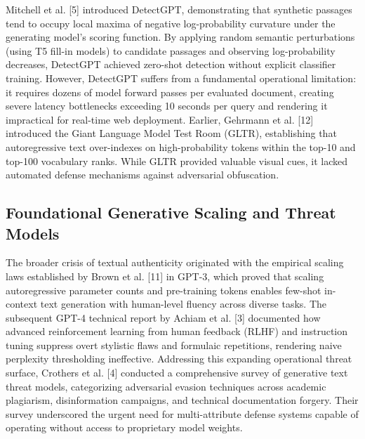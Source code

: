 \documentclass[conference]{IEEEtran}
\begin{document}
Mitchell et al. [5] introduced DetectGPT, demonstrating that synthetic passages tend to occupy local maxima of negative log-probability curvature under the generating model's scoring function. By applying random semantic perturbations (using T5 fill-in models) to candidate passages and observing log-probability decreases, DetectGPT achieved zero-shot detection without explicit classifier training. However, DetectGPT suffers from a fundamental operational limitation: it requires dozens of model forward passes per evaluated document, creating severe latency bottlenecks exceeding 10 seconds per query and rendering it impractical for real-time web deployment. Earlier, Gehrmann et al. [12] introduced the Giant Language Model Test Room (GLTR), establishing that autoregressive text over-indexes on high-probability tokens within the top-10 and top-100 vocabulary ranks. While GLTR provided valuable visual cues, it lacked automated defense mechanisms against adversarial obfuscation.

\subsection{Foundational Generative Scaling and Threat Models}
The broader crisis of textual authenticity originated with the empirical scaling laws established by Brown et al. [11] in GPT-3, which proved that scaling autoregressive parameter counts and pre-training tokens enables few-shot in-context text generation with human-level fluency across diverse tasks. The subsequent GPT-4 technical report by Achiam et al. [3] documented how advanced reinforcement learning from human feedback (RLHF) and instruction tuning suppress overt stylistic flaws and formulaic repetitions, rendering naive perplexity thresholding ineffective. Addressing this expanding operational threat surface, Crothers et al. [4] conducted a comprehensive survey of generative text threat models, categorizing adversarial evasion techniques across academic plagiarism, disinformation campaigns, and technical documentation forgery. Their survey underscored the urgent need for multi-attribute defense systems capable of operating without access to proprietary model weights.
\end{document}
